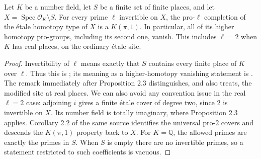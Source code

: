 \begin{proposition}
\label{D:arithmetic-invertible}
Let $K$ be a number field, let $S$ be a finite set of finite places,
and let $X=\operatorname{Spec}\mathcal O_K\setminus S$. For every prime
$\ell$ invertible on $X$, the pro-$\ell$ completion of the \'etale
homotopy type of $X$ is a $K(\pi,1)$. In particular, all of its higher
homotopy pro-groups, including its second one, vanish. This includes
$\ell=2$ when $K$ has real places, on the ordinary \'etale site.
\end{proposition}
\begin{proof}
Invertibility of $\ell$ means exactly that $S$ contains every finite
place of $K$ over $\ell$. Thus this is \cite[Proposition 2.3]{Schmidt2007};
its meaning as a higher-homotopy vanishing statement is
\cite[Proposition 2.1]{Schmidt2007}. The remark immediately after
Proposition 2.3 distinguishes, and also treats, the modified site at
real places. We can also avoid any convention issue in the real
$\ell=2$ case: adjoining $i$ gives a finite \'etale cover of degree
two, since $2$ is invertible on $X$. Its number field is totally
imaginary, where Proposition 2.3 applies. Corollary 2.2 of the same
source identifies the universal pro-$2$ covers and descends the
$K(\pi,1)$ property back to $X$.
For $K=\mathbb Q$, the allowed primes are exactly the primes in $S$.
When $S$ is empty there are no invertible primes, so a statement
restricted to such coefficients is vacuous.
\end{proof}

